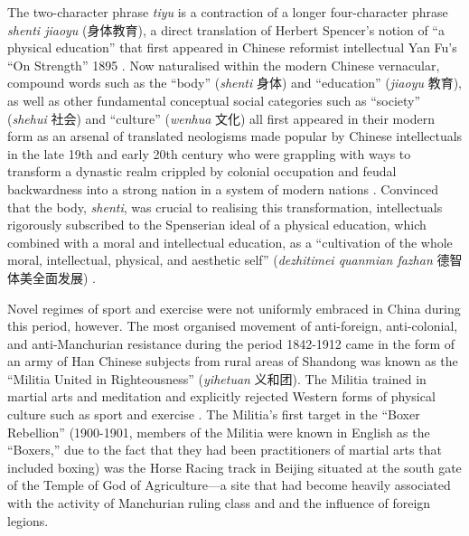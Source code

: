 {The two-character phrase \textit{tiyu} is a contraction of a longer four-character phrase \textit{shenti jiaoyu} (身体教育), a direct translation of Herbert Spencer’s notion of  ``a physical education'' that first appeared in Chinese reformist intellectual Yan Fu’s ``On Strength'' 1895 \citep[9-10]{Morris2004}.  Now naturalised within the modern Chinese vernacular, compound words such as the ``body'' (\textit{shenti} 身体) and ``education'' (\textit{jiaoyu} 教育), as well as other fundamental conceptual social categories such as ``society'' (\textit{shehui} 社会) and ``culture'' (\textit{wenhua} 文化) all first appeared in their modern form as an arsenal of translated neologisms made popular by Chinese intellectuals in the late 19th and early 20th century who were grappling with ways to transform a dynastic realm crippled by colonial occupation and feudal backwardness into a strong nation in a system of modern nations \citep{Pusey1983;Schwartz1964;Liu 1995;Huters2005}.   Convinced that the body, \textit{shenti}, was crucial to realising this transformation, intellectuals rigorously subscribed to the Spenserian ideal of a physical education, which combined with a moral and intellectual education, as a ``cultivation of the whole moral, intellectual, physical, and aesthetic self'' (\textit{dezhitimei quanmian fazhan} 德智体美全面发展) \citep[10]{Morris2004}.

Novel regimes of sport and exercise were not uniformly embraced in China during this period, however.  The most organised movement of anti-foreign, anti-colonial, and anti-Manchurian resistance during the period 1842-1912 came in the form of an army of Han Chinese subjects from rural areas of Shandong was known as the ``Militia United in Righteousness'' (\textit{yihetuan} 义和团).  The Militia trained in martial arts and meditation and explicitly rejected Western forms of physical culture such as sport and exercise \citep{Brownell2008}.  The Militia's first target in the ``Boxer Rebellion'' (1900-1901, members of the Militia were known in English as the ``Boxers,'' due to the fact that they had been practitioners of martial arts that included boxing) was the Horse Racing track in Beijing situated at the south gate of the Temple of God of Agriculture---a site that had become heavily associated with the activity of Manchurian ruling class and and the influence of foreign legions.

}
